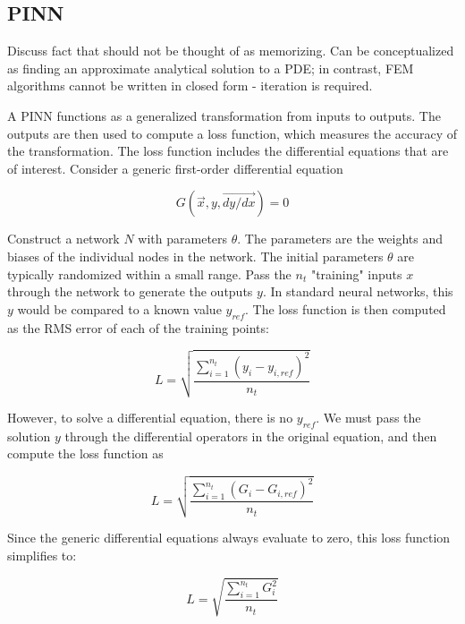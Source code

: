 \documentclass[]{article}
\begin{document}
\subsection{PINN}

Discuss fact that should not be thought of as memorizing. Can be conceptualized as finding an approximate analytical solution to a PDE; in contrast, FEM algorithms cannot be written in closed form - iteration is required.

A PINN functions as a generalized transformation from inputs to outputs. The outputs are then used to compute a loss function, which measures the accuracy of the transformation. The loss function includes the differential equations that are of interest. Consider a generic first-order differential equation

\begin{equation}
    G(\vec x, y, \vec {dy/dx}) = 0
\end{equation}

Construct a network $N$ with parameters $\theta$. The parameters are the weights and biases of the individual nodes in the network. The initial parameters $\theta$ are typically randomized within a small range. Pass the $n_t$ "training" inputs $x$ through the network to generate the outputs $y$. In standard neural networks, this $y$ would be compared to a known value $y_{ref}$. The loss function is then computed as the RMS error of each of the training points:

\begin{equation}
    L = \sqrt{ \frac {\sum_{i=1}^{n_t} (y_i - y_{i,ref})^2} {n_t}}
\end{equation}

However, to solve a differential equation, there is no $y_{ref}$. We must pass the solution $y$ through the differential operators in the original equation, and then compute the loss function as

\begin{equation}
    L = \sqrt{ \frac {\sum_{i=1}^{n_t} (G_i - G_{i,ref})^2} {n_t}}
\end{equation}

Since the generic differential equations always evaluate to zero, this loss function simplifies to:

\begin{equation}
    L = \sqrt{ \frac {\sum_{i=1}^{n_t} G_i^2} {n_t}}
\end{equation}
\end{document}
